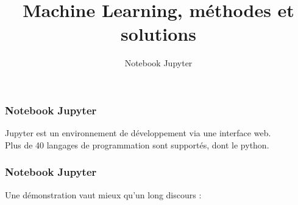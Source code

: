 \documentclass{formation}
\title{Machine Learning, méthodes et solutions}
\subtitle{Notebook Jupyter}
\begin{document}
\maketitle

\begin{frame}
  \frametitle{Notebook Jupyter}
  Jupyter est un environnement de développement via une interface web. \\
  Plus de 40 langages de programmation sont supportés, dont le python. \\
\end{frame}

\begin{frame}
  \frametitle{Notebook Jupyter}
  Une démonstration vaut mieux qu'un long discours : \\
\end{frame}
\end{document}
